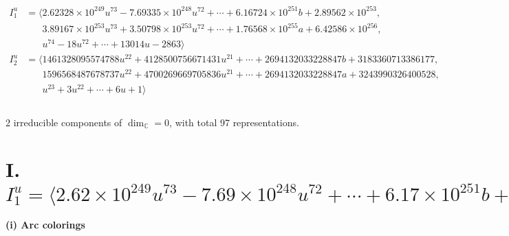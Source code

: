\documentclass[1p]{elsarticle_modified}
\theoremstyle{definition}
\begin{document}
\begin{align*}
I^u_{1}&=\langle 
2.62328\times10^{249} u^{73}-7.69335\times10^{248} u^{72}+\cdots+6.16724\times10^{251} b+2.89562\times10^{253},\\
\phantom{I^u_{1}}&\phantom{= \langle  }3.89167\times10^{253} u^{73}+3.50798\times10^{253} u^{72}+\cdots+1.76568\times10^{255} a+6.42586\times10^{256},\\
\phantom{I^u_{1}}&\phantom{= \langle  }u^{74}-18 u^{72}+\cdots+13014 u-2863\rangle \\
I^u_{2}&=\langle 
1461328095574788 u^{22}+4128500756671431 u^{21}+\cdots+2694132033228847 b+3183360713386177,\\
\phantom{I^u_{2}}&\phantom{= \langle  }1596568487678737 u^{22}+4700269669705836 u^{21}+\cdots+2694132033228847 a+3243990326400528,\\
\phantom{I^u_{2}}&\phantom{= \langle  }u^{23}+3 u^{22}+\cdots+6 u+1\rangle \\
\\
\end{align*}
\raggedright * 2 irreducible components of $\dim_{\mathbb{C}}=0$, with total 97 representations.\\
\newpage
\renewcommand{\arraystretch}{1}
\centering \section*{I. $I^u_{1}= \langle 2.62\times10^{249} u^{73}-7.69\times10^{248} u^{72}+\cdots+6.17\times10^{251} b+2.90\times10^{253},\;3.89\times10^{253} u^{73}+3.51\times10^{253} u^{72}+\cdots+1.77\times10^{255} a+6.43\times10^{256},\;u^{74}-18 u^{72}+\cdots+13014 u-2863 \rangle$}
\flushleft \textbf{(i) Arc colorings}\\
\end{document}

